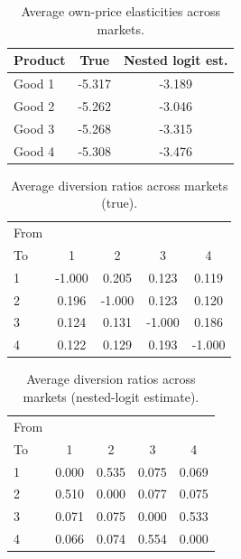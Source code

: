\begin{table}[H]
\centering
\caption{Average own-price elasticities across markets.}
\begin{tabular}{lcc}
\hline
Product & True & Nested logit est.\\
\hline
Good 1 & -5.317 & -3.189\\
Good 2 & -5.262 & -3.046\\
Good 3 & -5.268 & -3.315\\
Good 4 & -5.308 & -3.476\\
\hline
\end{tabular}
\end{table}

\begin{table}[H]
\centering
\caption{Average diversion ratios across markets (true).}
\begin{tabular}{lcccc}
\hline
From\\To & 1 & 2 & 3 & 4\\
\hline
1 & -1.000 & 0.205 & 0.123 & 0.119\\
2 & 0.196 & -1.000 & 0.123 & 0.120\\
3 & 0.124 & 0.131 & -1.000 & 0.186\\
4 & 0.122 & 0.129 & 0.193 & -1.000\\
\hline
\end{tabular}
\end{table}

\begin{table}[H]
\centering
\caption{Average diversion ratios across markets (nested-logit estimate).}
\begin{tabular}{lcccc}
\hline
From\\To & 1 & 2 & 3 & 4\\
\hline
1 & 0.000 & 0.535 & 0.075 & 0.069\\
2 & 0.510 & 0.000 & 0.077 & 0.075\\
3 & 0.071 & 0.075 & 0.000 & 0.533\\
4 & 0.066 & 0.074 & 0.554 & 0.000\\
\hline
\end{tabular}
\end{table}
